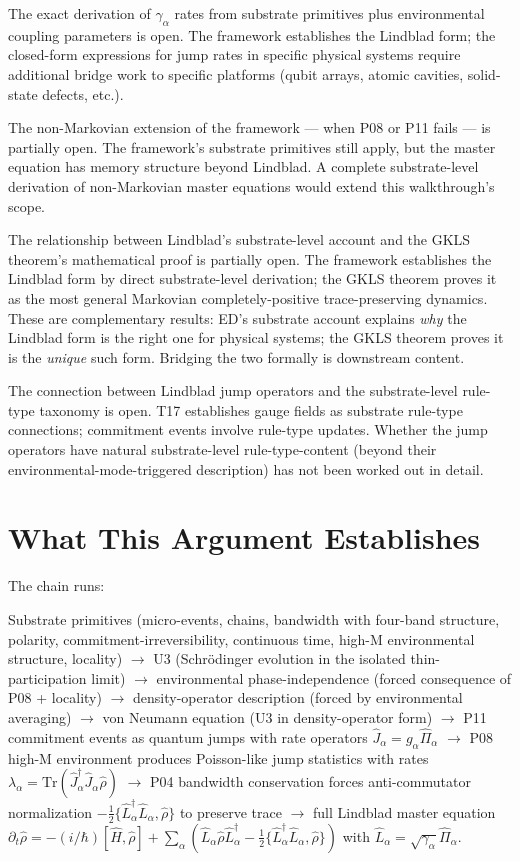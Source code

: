 \documentclass[11pt,a4paper]{article}
\begin{document}
The exact derivation of $\gamma_\alpha$ rates from substrate primitives plus environmental coupling parameters is open. The framework establishes the Lindblad form; the closed-form expressions for jump rates in specific physical systems require additional bridge work to specific platforms (qubit arrays, atomic cavities, solid-state defects, etc.).

The non-Markovian extension of the framework --- when P08 or P11 fails --- is partially open. The framework's substrate primitives still apply, but the master equation has memory structure beyond Lindblad. A complete substrate-level derivation of non-Markovian master equations would extend this walkthrough's scope.

The relationship between Lindblad's substrate-level account and the GKLS theorem's mathematical proof is partially open. The framework establishes the Lindblad form by direct substrate-level derivation; the GKLS theorem proves it as the most general Markovian completely-positive trace-preserving dynamics. These are complementary results: ED's substrate account explains \emph{why} the Lindblad form is the right one for physical systems; the GKLS theorem proves it is the \emph{unique} such form. Bridging the two formally is downstream content.

The connection between Lindblad jump operators and the substrate-level rule-type taxonomy is open. T17 establishes gauge fields as substrate rule-type connections; commitment events involve rule-type updates. Whether the jump operators have natural substrate-level rule-type-content (beyond their environmental-mode-triggered description) has not been worked out in detail.

\section{What This Argument Establishes}

The chain runs:

Substrate primitives (micro-events, chains, bandwidth with four-band structure, polarity, commitment-irreversibility, continuous time, high-M environmental structure, locality) $\to$ U3 (Schr\"odinger evolution in the isolated thin-participation limit) $\to$ environmental phase-independence (forced consequence of P08 + locality) $\to$ density-operator description (forced by environmental averaging) $\to$ von Neumann equation (U3 in density-operator form) $\to$ P11 commitment events as quantum jumps with rate operators $\hat J_\alpha = g_\alpha\hat\Pi_\alpha$ $\to$ P08 high-M environment produces Poisson-like jump statistics with rates $\lambda_\alpha = \mathrm{Tr}(\hat J_\alpha^\dagger\hat J_\alpha\hat\rho)$ $\to$ P04 bandwidth conservation forces anti-commutator normalization $-\tfrac{1}{2}\{\hat L_\alpha^\dagger\hat L_\alpha, \hat\rho\}$ to preserve trace $\to$ full Lindblad master equation $\partial_t\hat\rho = -(i/\hbar)[\hat H, \hat\rho] + \sum_\alpha(\hat L_\alpha\hat\rho\hat L_\alpha^\dagger - \tfrac{1}{2}\{\hat L_\alpha^\dagger\hat L_\alpha, \hat\rho\})$ with $\hat L_\alpha = \sqrt{\gamma_\alpha}\hat\Pi_\alpha$.
\end{document}
